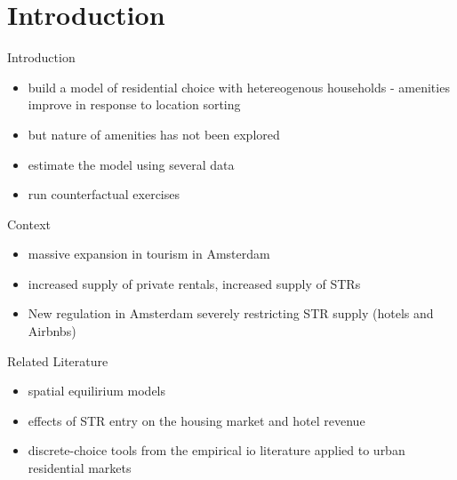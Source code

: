 



\begin{frame}[plain]
\titlepage
\note{
	\begin{itemize}
	\end{itemize}
}
\end{frame}

\section{Introduction}
\begin{frame}{Introduction}
	\begin{itemize}
		\item build a model of residential choice with hetereogenous households -  amenities improve in response to location sorting
        \item but nature of amenities has not been explored
		\item estimate the model using several data
        \item run counterfactual exercises
	\end{itemize}
\end{frame}

\begin{frame}{Context}
	\begin{itemize}
        \item massive expansion in tourism in Amsterdam
		\item increased supply of private rentals, increased supply of STRs
        \item New regulation in Amsterdam severely restricting STR supply (hotels and Airbnbs)
       
	\end{itemize}
\end{frame}

\begin{frame}{Related Literature}
	\begin{itemize}
		\item spatial equilirium models
        \item effects of STR entry on the housing market and hotel revenue
        \item discrete-choice tools from the empirical io literature applied to urban residential markets
	\end{itemize}
\end{frame}

